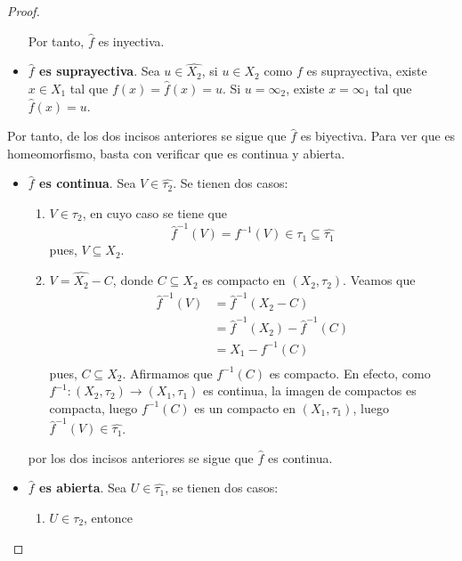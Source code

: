 \documentclass[12pt]{report}
\theoremstyle{largebreak}
\newcommand\cf[3]{\ensuremath{#1:#2\rightarrow#3}}
\begin{document}
\begin{proof}
\begin{itemize}
            Por tanto, $\hat{f}$ es inyectiva.
            \item \textbf{$\hat{f}$ es suprayectiva}. Sea $u\in \hat{X_2}$, si $u\in X_2$ como $f$ es suprayectiva, existe $x\in X_1$ tal que $f(x)=\hat{f}(x)=u$. Si $u=\infty_2$, existe $x=\infty_1$ tal que $\hat{f}(x)=u$.
        \end{itemize}
        Por tanto, de los dos incisos anteriores se sigue que $\hat{f}$ es biyectiva. Para ver que es homeomorfismo, basta con verificar que es continua y abierta.
        \begin{itemize}
            \item \textbf{$\hat{f}$ es continua}. Sea $V\in\hat{\tau_2}$. Se tienen dos casos:
            \begin{enumerate}
                \item $V\in\tau_2$, en cuyo caso se tiene que
                \begin{equation*}
                    \hat{f}^{-1}(V)=f^{-1}(V)\in\tau_1\subseteq\hat{\tau_1}
                \end{equation*}
                pues, $V\subseteq X_2$.
                \item $V=\hat{X_2}-C$, donde $C\subseteq X_2$ es compacto en $(X_2,\tau_2)$. Veamos que
                \begin{equation*}
                    \begin{split}
                        \hat{f}^{-1}(V)&=\hat{f}^{-1}(X_2-C)\\
                        &=\hat{f}^{-1}(X_2)-\hat{f}^{-1}(C)\\
                        &=X_1-f^{-1}(C)\\
                    \end{split}
                \end{equation*}
                pues, $C\subseteq X_2$. Afirmamos que $f^{-1}(C)$ es compacto. En efecto, como $\cf{f^{-1}}{(X_2,\tau_2)}{(X_1,\tau_1)}$ es continua, la imagen de compactos es compacta, luego $f^{-1}(C)$ es un compacto en $(X_1,\tau_1)$, luego $\hat{f}^{-1}(V)\in\hat{\tau_1}$.
            \end{enumerate}
            por los dos incisos anteriores se sigue que $\hat{f}$ es continua.
            \item \textbf{$\hat{f}$ es abierta}. Sea $U\in\hat{\tau_1}$, se tienen dos casos:
            \begin{enumerate}
                \item $U\in\tau_2$, entonce

\end{enumerate}
\end{itemize}
\end{proof}
\end{document}

